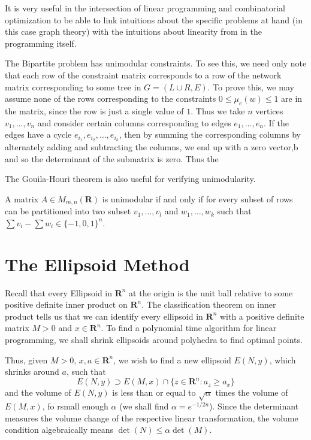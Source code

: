 It is very useful in the intersection of linear programming and combinatorial optimization to be able to link intuitions about the specific problems at hand (in this case graph theory) with the intuitions about linearity from in the programming itself.

\begin{example}
    The Bipartite problem has unimodular constraints. To see this, we need only note that each row of the constraint matrix corresponds to a row of the network matrix corresponding to some tree in $G = (L \cup R, E)$. To prove this, we may assume none of the rows corresponding to the constraints $0 \leq \mu_e(w) \leq 1$ are in the matrix, since the row is just a single value of $1$. Thus we take $n$ vertices $v_1, \dots, v_n$ and consider certain columns corresponding to edges $e_1, \dots, e_n$. If the edges have a cycle $e_{i_1}, e_{i_2}, \dots, e_{i_k}$, then by summing the corresponding columns by alternately adding and subtracting the columns, we end up with a zero vector,b and so the determinant of the submatrix is zero. Thus the 
\end{example}

The Gouila-Houri theorem is also useful for verifying unimodularity.

\begin{theorem}
    A matrix $A \in M_{m,n}(\mathbf{R})$ is unimodular if and only if for every subset of rows can be partitioned into two subset $v_1, \dots, v_l$ and $w_1, \dots, w_k$ such that $\sum v_i - \sum w_i \in \{ -1, 0, 1 \}^n$.
\end{theorem}

\chapter{The Ellipsoid Method}

Recall that every Ellipsoid in $\mathbf{R}^n$ at the origin is the unit ball relative to some positive definite inner product on $\mathbf{R}^n$. The classification theorem on inner product tells us that we can identify every ellipsoid in $\mathbf{R}^n$ with a positive definite matrix $M > 0$ and $x \in \mathbf{R}^n$. To find a polynomial time algorithm for linear programming, we shall shrink ellipsoids around polyhedra to find optimal points.

Thus, given $M > 0$, $x, a \in \mathbf{R}^n$, we wish to find a new ellipsoid $E(N,y)$, which shrinks around $a$, such that
%
\[ E(N, y) \supset E(M,x) \cap \{ z \in \mathbf{R}^n : a_z \geq a_x \} \]
%
and the volume of $E(N, y)$ is less than or equal to $\sqrt{\alpha}$ times the volume of $E(M,x)$, fo rsmall enough $\alpha$ (we shall find $\alpha = e^{-1/2n}$). Since the determinant measures the volume change of the respective linear transformation, the volume condition algebraically means $\det(N) \leq \alpha \det(M)$.

